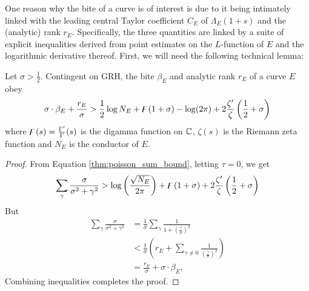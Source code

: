 One reason why the bite of a curve is of interest is due to it being intimately linked with the leading central Taylor coefficient $C_E$ of $\Lambda_E(1+s)$ and the (analytic) rank $r_E$. Specifically, the three quantities are linked by a suite of explicit inequalities derived from point estimates on the $L$-function of $E$ and the logarithmic derivative thereof. First, we will need the following technical lemma:
\begin{lemma}\label{lem:bite_rank_sigma_inequality}
Let $\sigma > \frac{1}{2}$. Contingent on GRH, the bite $\beta_E$ and analytic rank $r_E$ of a curve $E$ obey
\begin{equation}
\sigma \cdot \beta_E + \frac{r_E}{\sigma} > \frac{1}{2} \log N_E + \digamma(1+\sigma)-\log(2\pi) + 2\frac{\zeta^{\prime}}{\zeta}\left(\frac{1}{2}+\sigma\right)
\end{equation}
where $\digamma(s) = \frac{\Gamma^{\prime}}{\Gamma}(s)$ is the digamma function on $\mathbb{C}$, $\zeta(s)$ is the Riemann zeta function and $N_E$ is the conductor of $E$.
\end{lemma}
\begin{proof}
From Equation \ref{thm:poisson_sum_bound}, letting $\tau=0$, we get
\begin{equation}
\sum_\gamma \frac{\sigma}{\sigma^2+\gamma^2} > \log\left(\frac{\sqrt{N_E}}{2\pi}\right) + \digamma(1+\sigma) + 2\frac{\zeta^{\prime}}{\zeta}\left(\frac{1}{2}+\sigma\right)
\end{equation}
But
\begin{align*}
\sum_\gamma \frac{\sigma}{\sigma^2+\gamma^2} &= \frac{1}{\sigma} \sum_\gamma \frac{1}{1+\left(\frac{\gamma}{\sigma}\right)^2} \\
&< \frac{1}{\sigma}\left(r_E + \sum_{\gamma\ne 0} \frac{1}{\left(\frac{\gamma}{\sigma}\right)^2} \right) \\
&= \frac{r_E}{\sigma} + \sigma\cdot \beta_E,
\end{align*}
Combining inequalities completes the proof.
\end{proof}

